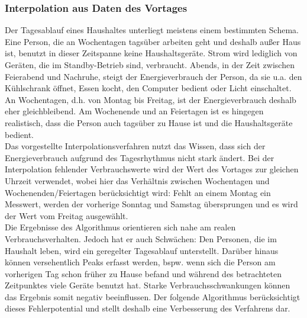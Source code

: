 \subsubsection{Interpolation aus Daten des Vortages}
Der Tagesablauf eines Haushaltes unterliegt meistens einem bestimmten Schema. Eine Person, die an Wochentagen tagsüber arbeiten geht und deshalb außer Haus ist, benutzt in dieser Zeitspanne keine Haushaltsgeräte. Strom wird lediglich von Geräten, die im Standby-Betrieb sind, verbraucht. Abends, in der Zeit zwischen Feierabend und Nachruhe, steigt der Energieverbrauch der Person, da sie u.a. den Kühlschrank öffnet, Essen kocht, den Computer bedient oder Licht einschaltet. An Wochentagen, d.h. von Montag bis Freitag, ist der Energieverbrauch deshalb eher gleichbleibend. Am Wochenende und an Feiertagen ist es hingegen realistisch, dass die Person auch tagsüber zu Hause ist und die Haushaltsgeräte bedient.\\
Das vorgestellte Interpolationsverfahren nutzt das Wissen, dass sich der Energieverbrauch aufgrund des Tagesrhythmus nicht stark ändert. Bei der Interpolation fehlender Verbrauchswerte wird der Wert des Vortages zur gleichen Uhrzeit verwendet, wobei hier das Verhältnis zwischen Wochentagen und Wochenenden/Feiertagen berücksichtigt wird: Fehlt an einem Montag ein Messwert, werden der vorherige Sonntag und Samstag übersprungen und es wird der Wert vom Freitag ausgewählt.\\
Die Ergebnisse des Algorithmus orientieren sich nahe am realen Verbrauchsverhalten. Jedoch hat er auch Schwächen: Den Personen, die im Haushalt leben, wird ein geregelter Tagesablauf unterstellt. Darüber hinaus können versehentlich Peaks erfasst werden, bspw. wenn sich die Person am vorherigen Tag schon früher zu Hause befand und während des betrachteten Zeitpunktes viele Geräte benutzt hat. Starke Verbrauchsschwankungen können das Ergebnis somit negativ beeinflussen. Der folgende Algorithmus berücksichtigt dieses Fehlerpotential und stellt deshalb eine Verbesserung des Verfahrens dar.

